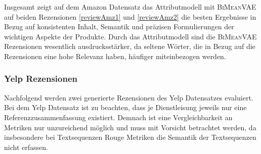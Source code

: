 
Insgesamt zeigt auf dem Amazon Datensatz das Attributmodell mit \textsc{BiMeanVAE} auf beiden Rezensionen \ref{reviewAmz1} und \ref{reviewAmz2} die besten Ergebnisse in Bezug auf konsistenten Inhalt, Semantik und präzisen Formulierungen der wichtigen Aspekte der Produkte.
Durch das Attributmodell sind die \textsc{BiMeanVAE} Rezensionen wesentlich ausdrucksstärker, da seltene Wörter, die in Bezug auf die Rezensionen eine hohe Relevanz haben, häufiger miteinbezogen werden.

\pagebreak
\subsubsection{Yelp Rezensionen} %
Nachfolgend werden zwei generierte Rezensionen des Yelp Datensatzes evaluiert. 
Bei dem Yelp Datensatz ist zu beachten, dass je Dienstleisung jeweils nur eine Referenzzusammenfassung existiert.
Demnach ist eine Vergleichbarkeit an Metriken nur unzureichend möglich und muss mit Vorsicht betrachtet werden, da insbesondere bei Textsequenzen Rouge Metriken die Semantik der Textsequenzen nicht erfassen.

